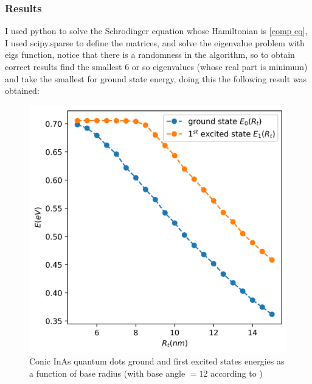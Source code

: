 \documentclass[twoside,11pt]{article}
\begin{document}
        \subsubsection{Results}
        I used python to solve the Schrodinger equation whose Hamiltonian is \ref{comp eq}, I used scipy.sparse to define the matrices, and solve the eigenvalue problem with eigs function, notice that there is a randomness in the algorithm, so to obtain correct results find the smallest 6 or so eigenvalues (whose real part is minimum) and take the smallest for ground state energy, doing this the following result was obtained:
        \begin{figure}[h]
            \centering
            \includegraphics[scale = 0.5]{output.png}
            \caption{Conic InAs quantum dots ground and first excited states energies as a function of base radius (with base angle $= 12$ according to \cite{marzin1994calculation})}
            \label{fig my QD enegries}
        \end{figure}
    
\end{document}
